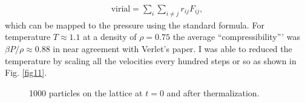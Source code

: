 \documentclass[singlepage,notitlepage,nofootinbib,11pt]{revtex4-1}
\begin{document}
\begin{align*}
\text{virial} = \sum_i\sum_{i\neq j}r_{ij}F_{ij},
\end{align*}
which can be mapped to the pressure using the standard formula. For temperature $T\approx1.1$ at a density of $\rho=0.75$ the average ``compressibility''' was $\beta P/\rho \approx 0.88$ in near agreement with Verlet's paper. I was able to reduced the temperature by scaling all the velocities every hundred steps or so as shown in Fig. \ref{fig11}.
\begin{figure}[]
  \captionsetup[subfigure]{labelformat=empty}
\centering
\caption{\label{fig6} 1000 particles on the lattice at $t=0$ and after thermalization.}
\end{figure}
\end{document}
